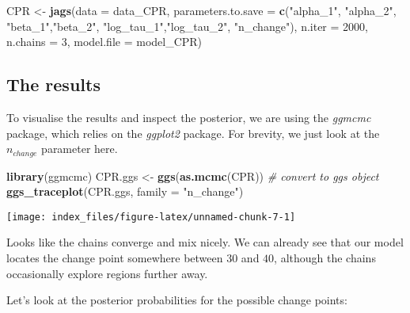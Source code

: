 \documentclass[]{article}
\newenvironment{Shaded}{\begin{snugshade}}{\end{snugshade}}
\newcommand{\KeywordTok}[1]{\textcolor[rgb]{0.13,0.29,0.53}{\textbf{#1}}}
\newcommand{\DataTypeTok}[1]{\textcolor[rgb]{0.13,0.29,0.53}{#1}}
\newcommand{\DecValTok}[1]{\textcolor[rgb]{0.00,0.00,0.81}{#1}}
\newcommand{\StringTok}[1]{\textcolor[rgb]{0.31,0.60,0.02}{#1}}
\newcommand{\CommentTok}[1]{\textcolor[rgb]{0.56,0.35,0.01}{\textit{#1}}}
\newcommand{\NormalTok}[1]{#1}
\begin{document}
\begin{Shaded}
\begin{Highlighting}[]
\NormalTok{ CPR  <-}\StringTok{ }\KeywordTok{jags}\NormalTok{(}\DataTypeTok{data =}\NormalTok{ data_CPR, }
                         \DataTypeTok{parameters.to.save =} \KeywordTok{c}\NormalTok{(}\StringTok{"alpha_1"}\NormalTok{, }\StringTok{"alpha_2"}\NormalTok{, }
                                                \StringTok{"beta_1"}\NormalTok{,}\StringTok{"beta_2"}\NormalTok{,}
                                                \StringTok{"log_tau_1"}\NormalTok{,}\StringTok{"log_tau_2"}\NormalTok{,}
                                                \StringTok{"n_change"}\NormalTok{), }
                         \DataTypeTok{n.iter =} \DecValTok{2000}\NormalTok{, }
                         \DataTypeTok{n.chains =} \DecValTok{3}\NormalTok{,}
                         \DataTypeTok{model.file =}\NormalTok{ model_CPR)}
\end{Highlighting}
\end{Shaded}

\subsection{The results}\label{the-results}

To visualise the results and inspect the posterior, we are using the
\emph{ggmcmc} package, which relies on the \emph{ggplot2} package. For
brevity, we just look at the \(n_{change}\) parameter here.

\begin{Shaded}
\begin{Highlighting}[]
\KeywordTok{library}\NormalTok{(ggmcmc)}
\NormalTok{CPR.ggs <-}\StringTok{ }\KeywordTok{ggs}\NormalTok{(}\KeywordTok{as.mcmc}\NormalTok{(CPR)) }\CommentTok{# convert to ggs object}
\KeywordTok{ggs_traceplot}\NormalTok{(CPR.ggs, }\DataTypeTok{family =} \StringTok{"n_change"}\NormalTok{) }
\end{Highlighting}
\end{Shaded}

\texttt{[image: index\_files/figure-latex/unnamed-chunk-7-1]}

Looks like the chains converge and mix nicely. We can already see that
our model locates the change point somewhere between \(30\) and \(40\),
although the chains occasionally explore regions further away.

Let's look at the posterior probabilities for the possible change
points:
\end{document}
